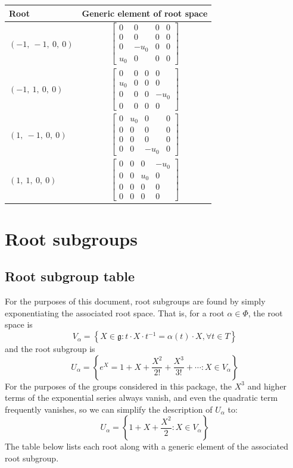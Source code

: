 \documentclass[11pt]{article}
\newcommand{\noi}{\noindent}
\newcommand{\inv}{^{-1}}
\newcommand{\lb}{\left\{}
\newcommand{\rb}{\right\}}
\newcommand{\frakg}{\mathfrak{g}}
\theoremstyle{definition}
\begin{document}
\noindent \begin{longtable}{|l|c|}
    \hline
    \textbf{Root} & \textbf{Generic element of root space} \\
    \hline
    \endhead
    $\left( -1, \  -1, \  0, \  0\right)$ & ${\left[\begin{matrix}0 & 0 & 0 & 0\\0 & 0 & 0 & 0\\0 & - u_{0} & 0 & 0\\u_{0} & 0 & 0 & 0\end{matrix}\right]}$ \\
    \hline
    $\left( -1, \  1, \  0, \  0\right)$ & ${\left[\begin{matrix}0 & 0 & 0 & 0\\u_{0} & 0 & 0 & 0\\0 & 0 & 0 & - u_{0}\\0 & 0 & 0 & 0\end{matrix}\right]}$ \\
    \hline
    $\left( 1, \  -1, \  0, \  0\right)$ & ${\left[\begin{matrix}0 & u_{0} & 0 & 0\\0 & 0 & 0 & 0\\0 & 0 & 0 & 0\\0 & 0 & - u_{0} & 0\end{matrix}\right]}$ \\
    \hline
    $\left( 1, \  1, \  0, \  0\right)$ & ${\left[\begin{matrix}0 & 0 & 0 & - u_{0}\\0 & 0 & u_{0} & 0\\0 & 0 & 0 & 0\\0 & 0 & 0 & 0\end{matrix}\right]}$ \\
    \hline
\end{longtable}


\newpage
\section{Root subgroups}

\subsection{Root subgroup table}

\noi For the purposes of this document, root subgroups are found by simply exponentiating the associated root space. That is, for a root $\alpha \in \Phi$, the root space is
\[
	V_\alpha = \lb X \in \frakg : t \cdot X \cdot t \inv = \alpha(t) \cdot X, \forall t \in T \rb
\]
and the root subgroup is
\[
	U_\alpha = \lb e^X = 1 + X + \frac{X^2}{2!} + \frac{X^3}{3!} + \cdots : X \in V_\alpha \rb
\]
For the purposes of the groups considered in this package, the $X^3$ and higher terms of the exponential series always vanish, and even the quadratic term frequently vanishes, so we can simplify the description of $U_\alpha$ to:
\[
	U_\alpha = \lb 1 + X + \frac{X^2}{2} : X \in V_\alpha \rb
\]
The table below lists each root along with a generic element of the associated root subgroup.
\end{document}
